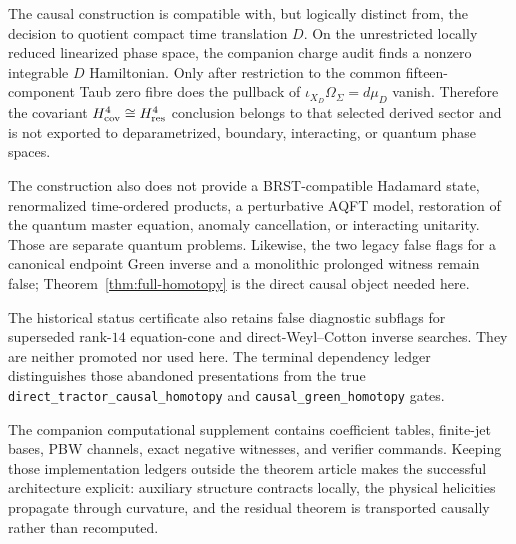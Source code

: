 \documentclass[11pt]{article}
\theoremstyle{definition}
\theoremstyle{remark}
\begin{document}
The causal construction is compatible with, but logically distinct from,
the decision to quotient compact time translation $D$.  On the unrestricted
locally reduced linearized phase space, the companion charge audit finds a
nonzero integrable $D$ Hamiltonian.  Only after restriction to the common
fifteen-component Taub zero fibre does the pullback of
$\iota_{X_D}\Omega_\Sigma=d\mu_D$ vanish.  Therefore the covariant
$H^4_{\rm cov}\cong H^4_{\rm res}$ conclusion belongs to that selected
derived sector and is not exported to deparametrized, boundary, interacting,
or quantum phase spaces.

The construction also does not provide a BRST-compatible Hadamard state,
renormalized time-ordered products, a perturbative AQFT model, restoration of
the quantum master equation, anomaly cancellation, or interacting unitarity.
Those are separate quantum problems.  Likewise, the two legacy false flags
for a canonical endpoint Green inverse and a monolithic prolonged witness
remain false; Theorem~\ref{thm:full-homotopy} is the direct causal object
needed here.

The historical status certificate also retains false diagnostic subflags
for superseded rank-$14$ equation-cone and direct-Weyl--Cotton inverse
searches.  They are neither promoted nor used here.  The terminal dependency
ledger distinguishes those abandoned presentations from the true
\texttt{direct\_tractor\_causal\_homotopy} and
\texttt{causal\_green\_homotopy} gates.

The companion computational supplement contains coefficient tables,
finite-jet bases, PBW channels, exact negative witnesses, and verifier
commands.  Keeping those implementation ledgers outside the theorem article
makes the successful architecture explicit: auxiliary structure contracts
locally, the physical helicities propagate through curvature, and the
residual theorem is transported causally rather than recomputed.
\end{document}
